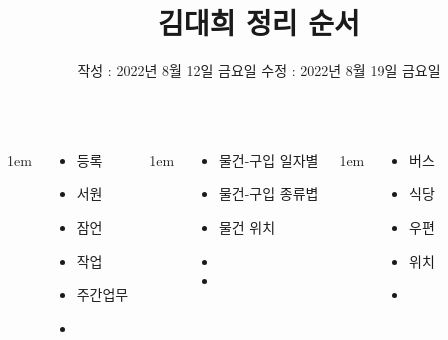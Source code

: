 \documentclass[	20pt, 
							a0paper, 
							landscape,
							margin=0mm, %
							innermargin=10mm,  		%
							blockverticalspace=4mm, %
							colspace=5mm, 
							subcolspace=0mm
							]{tikzposter}
\title{ 김대희 정리 순서 }
\author{ 		작성 : 2022년 8월 12일 금요일 수정 : 2022년 8월 19일 금요일 }
\begin{document}
	\maketitle[
					width=841mm,
					linewidth = 2mm,
					innersep=4mm,
					titletotopverticalspace=2mm, %
					titletoblockverticalspace=2mm, %
					titletextscale =4, 
				]


	\begin{columns}


			{
					\setlength{\leftmargini}{4em}
					\setlength{\labelsep} {1em}
				\begin{LARGE}
					\begin{itemize}
					\item 등록 
					\item 서원
					\item 잠언
					\item 작업
					\item 주간업무
					\item 
					\end{itemize}
				\end{LARGE}
			} %


			{
					\setlength{\leftmargini}{4em}
					\setlength{\labelsep} {1em}
				\begin{LARGE}
					\begin{itemize}
					\item 물건-구입 일자별 
					\item 물건-구입 종류볍
					\item 물건 위치
					\item
					\item
					\end{itemize}
				\end{LARGE}
			} %


			{
					\setlength{\leftmargini}{4em}
					\setlength{\labelsep} {1em}
				\begin{LARGE}
					\begin{itemize}
					\item 버스
					\item 식당
					\item 우편
					\item 위치
					\item
					\end{itemize}
				\end{LARGE}
			} %



\end{columns}
\end{document}
